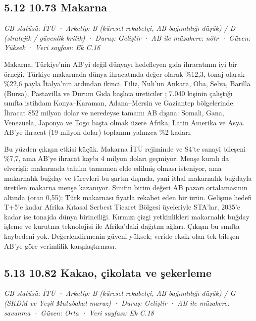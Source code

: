 \hypertarget{nace_kartlar_10-12-512-1073-makarna}{%
\subsection{5.12 10.73 Makarna}\label{nace_kartlar_10-12-512-1073-makarna}}

\emph{GB statüsü: İTÜ · Arketip: B (küresel rekabetçi, AB bağımlılığı düşük) / D (stratejik / güvenlik kritik) · Duruş: Geliştir · AB ile müzakere: nötr · Güven: Yüksek · Veri sayfası: Ek C.16}

Makarna, Türkiye'nin AB'yi değil dünyayı hedefleyen gıda ihracatının iyi bir örneği. Türkiye makarnada dünya ihracatında değer olarak \%12,3, tonaj olarak \%22,6 payla İtalya'nın ardından ikinci. Filiz, Nuh'un Ankara, Oba, Selva, Barilla (Bursa), Pastavilla ve Durum Gıda başlıca üreticiler \etiketH{}; 7.040 kişinin çalıştığı sınıfta istihdam Konya--Karaman, Adana--Mersin ve Gaziantep bölgelerinde. İhracat 852 milyon dolar ve neredeyse tamamı AB dışına: Somali, Gana, Venezuela, Japonya ve Togo başta olmak üzere Afrika, Latin Amerika ve Asya. AB'ye ihracat (19 milyon dolar) toplamın yalnızca \%2 kadarı.

Bu yüzden çıkışın etkisi küçük. Makarna İTÜ rejiminde ve S4'te sanayi bileşeni \%7,7, ama AB'ye ihracat kaybı 4 milyon doları geçmiyor. Menşe kuralı da elverişli: makarnada tahılın tamamen elde edilmiş olması isteniyor, ama makarnalık buğday ve türevleri bu şartın dışında, yani ithal makarnalık buğdayla üretilen makarna menşe kazanıyor. Sınıfın birim değeri AB pazarı ortalamasının altında (oran 0,55); Türk makarnası fiyatla rekabet eden bir ürün. Gelişme hedefi T+5'e kadar Afrika Kıtasal Serbest Ticaret Bölgesi üyeleriyle STA'lar, 2035'e kadar ise tonajda dünya birinciliği. Kırmızı çizgi yetkinlikleri makarnalık buğday işleme ve kurutma teknolojisi ile Afrika'daki dağıtım ağları. Çıkışın bu sınıfta kaybedeni yok. Değerlendirmenin güveni yüksek; veride eksik olan tek bileşen AB'ye göre verimlilik karşılaştırması.

\hypertarget{nace_kartlar_10-12-513-1082-kakao-uxe7ikolata-ve-ux15fekerleme}{%
\subsection{5.13 10.82 Kakao, çikolata ve şekerleme}\label{nace_kartlar_10-12-513-1082-kakao-uxe7ikolata-ve-ux15fekerleme}}

\emph{GB statüsü: İTÜ · Arketip: B (küresel rekabetçi, AB bağımlılığı düşük) / G (SKDM ve Yeşil Mutabakat maruz) · Duruş: Geliştir · AB ile müzakere: savunma · Güven: Orta · Veri sayfası: Ek C.18}

